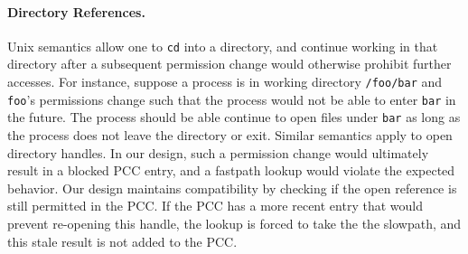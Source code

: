 \paragraph{Directory References.}
Unix semantics allow one to {\tt cd} into a directory, and continue
working in that directory after a subsequent permission change 
would otherwise prohibit further accesses.
For instance, suppose a process is in working directory {\tt /foo/bar}
and {\tt foo}'s permissions change such that the process would not
be able to enter {\tt bar} in the future.
The process should be able continue to open files under {\tt bar}
as long as the process does not leave the directory or exit.
Similar semantics apply to open directory handles.
In our design, such a permission change would ultimately result in a blocked PCC entry,
and a fastpath lookup would violate the expected behavior.
Our design maintains compatibility by
checking if the open reference is still permitted in the PCC.
If the PCC has a more recent entry that would prevent re-opening this handle,
the lookup is forced to take the 
the slowpath, and this stale result is not added to the PCC.


